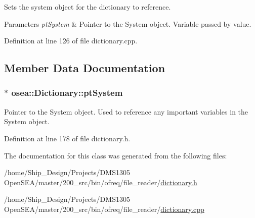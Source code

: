 Sets the system object for the dictionary to reference. 


\begin{DoxyParams}{Parameters}
{\em pt\-System} & Pointer to the System object. Variable passed by value. \\
\hline
\end{DoxyParams}


Definition at line 126 of file dictionary.\-cpp.



\subsection{Member Data Documentation}
\hypertarget{classosea_1_1_dictionary_a72bf4127a7ee1fb2b784abb6df020fed}{
\subsubsection[{pt\-System}]{$\ast$ osea\-::\-Dictionary\-::pt\-System\hspace{0.3cm}{\ttfamily [protected]}}}\label{classosea_1_1_dictionary_a72bf4127a7ee1fb2b784abb6df020fed}


Pointer to the System object. Used to reference any important variables in the System object. 



Definition at line 178 of file dictionary.\-h.



The documentation for this class was generated from the following files\-:\begin{DoxyCompactItemize}
\item 
/home/\-Ship\-\_\-\-Design/\-Projects/\-D\-M\-S1305 Open\-S\-E\-A/master/200\-\_\-src/bin/ofreq/file\-\_\-reader/\hyperlink{dictionary_8h}{dictionary.\-h}\item 
/home/\-Ship\-\_\-\-Design/\-Projects/\-D\-M\-S1305 Open\-S\-E\-A/master/200\-\_\-src/bin/ofreq/file\-\_\-reader/\hyperlink{dictionary_8cpp}{dictionary.\-cpp}\end{DoxyCompactItemize}
